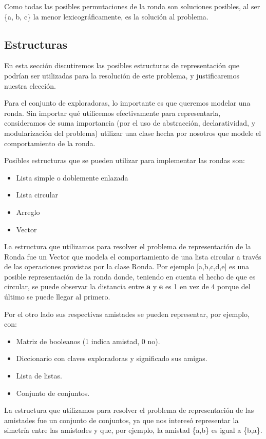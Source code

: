 \documentclass[spanish,a4paper]{article}
\begin{document}
Como todas las posibles permutaciones de la ronda son soluciones posibles, al ser \{a, b, c\} la menor lexicográficamente, 
es la solución al problema.

\subsection{Estructuras}

En esta sección discutiremos las posibles estructuras de representación que podrían ser utilizadas
para la resolución de este problema, y justificaremos nuestra elección.

Para el conjunto de exploradoras, lo importante es que queremos modelar una ronda. Sin importar
qué utilicemos efectivamente para representarla, consideramos de suma importancia (por el uso de abstracción,
declaratividad, y modularización del problema) utilizar una clase hecha por nosotros que modele el 
comportamiento de la ronda.

Posibles estructuras que se pueden utilizar para implementar las rondas son: 
\begin{itemize}
\item Lista simple o doblemente enlazada
\item Lista circular
\item Arreglo
\item Vector
\end{itemize}
La estructura que utilizamos para resolver el problema de representación de la Ronda 
fue un Vector que modela el comportamiento de una 
lista circular a través de las operaciones provistas por la clase Ronda. Por ejemplo [a,b,c,d,e] es una 
posible representación de la ronda donde, teniendo en cuenta el hecho de que es circular,
se puede observar la distancia entre \textbf{a} y \textbf{e} es 1 en vez de 4 porque del último se puede llegar al primero.

Por el otro lado sus respectivas amistades se pueden representar, por ejemplo, con:
\begin{itemize}
\item Matriz de booleanos (1 indica amistad, 0 no).
\item Diccionario con claves exploradoras y significado sus amigas.
\item Lista de listas.
\item Conjunto de conjuntos.
\end{itemize}
La estructura que utilizamos para resolver el problema de representación de las amistades fue un conjunto de
conjuntos, ya que nos interesó representar la simetría entre las amistades y que, por ejemplo, la amistad 
\{a,b\} es igual a \{b,a\}.
\end{document}
